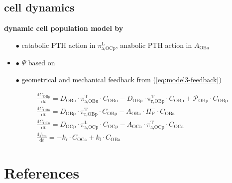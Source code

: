 \documentclass[%
aspectratio=169,  %
]{beamer}
\begin{document}
\subsection{cell dynamics}
\begin{frame}
\textbf{dynamic cell population model by \cite{Lavaill.2020}}
\begin{itemize}
\item[$\bullet$] catabolic PTH action in $\pi_{\text{a,OCp}}^{\text{L}} $, anabolic PTH action in $A_\text{OBa}$
\item{$\bullet$} $\Psi$ based on \cite{Lerebours.2016}
\item[$\bullet$]  geometrical and mechanical feedback from (\ref{eq:model3-feedback})
\end{itemize}
\begin{subequations}
\begin{align}
& \frac{\text{d} C_\text{OBp}}{\text{d} t} =  D_\text{OBu} \cdot \pi_{\text{a,OBu}}^\text{T} \cdot C_\text{OBu} -  D_\text{OBp}  \cdot \pi_{\text{r,OBp}}^\text{T} \cdot C_\text{OBp} + \mathcal{P}_\text{OBp} \cdot C_\text{OBp}  \\
& \frac{\text{d} C_\text{OBa}}{\text{d} t} =   D_\text{OBp}  \cdot  \pi_{\text{r,OBp}}^\text{T} \cdot  C_\text{OBp}-  A_\text{OBa} \cdot H^{-}_\text{P} \cdot C_\text{OBa}\\ 
& \frac{\text{d} C_\text{OCa}}{\text{d} t} =  D_\text{OCp} \cdot \pi_{\text{a,OCp}}^{\text{L}} \cdot C_\text{OCp} -  A_\text{OCa}   \cdot \pi_{\text{a,OCp}}^\text{T} \cdot C_\text{OCa}  \\
&\frac{\text{d} f_{bm}}{\text{d} t} = -k_\text{r} \cdot C_\text{OCa} + k_\text{f} \cdot C_\text{OBa} 
\end{align}
\label{eq:model4}
\end{subequations}
\end{frame}


\section*{References}%
\begin{frame}[allowframebreaks]

   
\end{frame}
\end{document}
